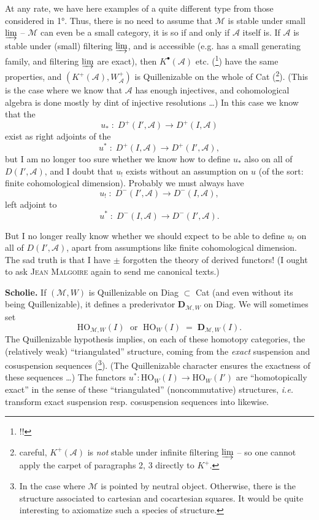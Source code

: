 At any rate, we have here examples of a quite different type from those considered in 1°. Thus, there is no need to assume that $\mathcal{M}$ is stable under small $\varinjlim$ -- $\mathcal{M}$ can even be a small category, it is so if and only if $\mathcal{A}$ itself is. If $\mathcal{A}$ is stable under (small) filtering $\varinjlim$, and is accessible (e.g. has a small generating family, and filtering $\varinjlim$ are exact), then $K^{\bullet}(\mathcal{A})$ etc. (\footnote[30]{!!}) have the same properties, and $(K^{+}(\mathcal{A}),W_{\mathcal{A}}^{+})$ is Quillenizable on the whole of Cat (\footnote[31]{careful, $K^{+}(\mathcal{A})$ is \textit{not} stable under infinite filtering $\varinjlim$ -- so one cannot apply the carpet of paragraphs 2, 3 directly to $K^{+}$.}). (This is the case where we know that $\mathcal{A}$ has enough injectives, and cohomological algebra is done mostly by dint of injective resolutions \dots) In this case we know that the %
\[ u_{*} \;:\; D^{+}(I',\mathcal{A}) \longrightarrow D^{+}(I,\mathcal{A}) \]
exist as right adjoints of the
\[ u^{*} \;:\; D^{+}(I,\mathcal{A}) \longrightarrow D^{+}(I',\mathcal{A}), \]
but I am no longer too sure whether we know how to define $u_{*}$ also on all of $D(I',\mathcal{A})$, and I doubt that $u_{!}$ exists without an assumption on $u$ (of the sort: finite cohomological dimension). Probably we must always have
\[ u_{!} \;:\; D^{-}(I',\mathcal{A}) \longrightarrow D^{-}(I,\mathcal{A}), \]
left adjoint to
\[ u^{*} \;:\; D^{-}(I,\mathcal{A}) \longrightarrow D^{-}(I',\mathcal{A}). \]

But I no longer really know whether we should expect to be able to define $u_{!}$ on all of $D(I',\mathcal{A})$, apart from assumptions like finite cohomological dimension. The sad truth is that I have $\pm$ forgotten the theory of derived functors! (I ought to ask \textsc{Jean Malgoire} again to send me canonical texts.)

\textbf{Scholie.} If $(\mathcal{M},W)$ is Quillenizable on Diag $\subset$ Cat (and even without its being Quillenizable), it defines a prederivator $\mathbf{D}_{\mathcal{M},W}$ on Diag. We will sometimes set
\[ \mathrm{HO}_{\mathcal{M},W}(I) \;\text{ or }\; \mathrm{HO}_{W}(I) \;=\; \mathbf{D}_{\mathcal{M},W}(I). \]
The Quillenizable hypothesis implies, on each of these homotopy categories, the (relatively weak) ``triangulated'' structure, coming from the \textit{exact} suspension and cosuspension sequences (\footnote[32]{In the case where $\mathcal{M}$ is pointed by neutral object. Otherwise, there is the structure associated to cartesian and cocartesian squares. It would be quite interesting to axiomatize such a species of structure.}). (The Quillenizable character ensures the exactness of these sequences \dots) The functors $u^{*} : \mathrm{HO}_{W}(I) \longrightarrow \mathrm{HO}_{W}(I')$
are ``homotopically exact'' in the sense of these ``triangulated'' (noncommutative) structures, \textit{i.e.} transform exact suspension resp. cosuspension sequences into likewise. %

